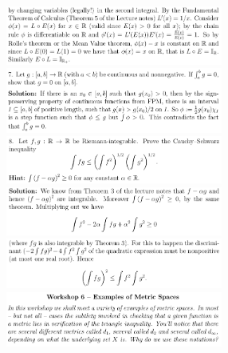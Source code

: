 \documentclass[8pt,landscape]{article}
\begin{document}
\begin{multicols}{3}
    \includegraphics[width=270]{045.png} \\
    \includegraphics[width=270]{046.png} \\
    \includegraphics[width=270]{047.png} \\
    \includegraphics[width=270]{048.png} \\
    \includegraphics[width=270]{049.png} \\
    \includegraphics[width=270]{050.png} \\

\end{multicols}
\end{document}
